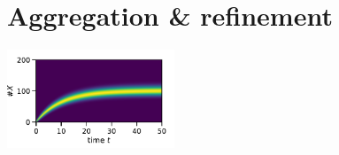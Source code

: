 \documentclass[9pt]{beamer}
\begin{document}
\section{Aggregation {\&} refinement}
\begin{frame}
      \vfill
  \centering
    \insertsectionhead\par%
    \vspace{1cm}
    \includegraphics[width=5cm]{../gfx/bd_dist.pdf}
  \vfill
\end{frame}
\end{document}
